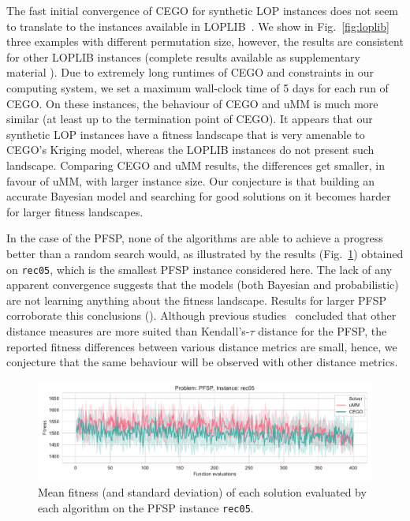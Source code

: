 \documentclass[runningheads]{llncs}
\begin{document}
The fast initial convergence of CEGO for synthetic LOP instances does not seem
to translate to the instances available in LOPLIB~\citep{}. We show in
Fig.~\ref{fig:loplib} three examples with different permutation size, however,
the results are consistent for other LOPLIB instances (complete results
available as supplementary material \supplement). Due to extremely long
runtimes of CEGO and constraints in our computing system, we set a maximum
wall-clock time of 5 days for each run of CEGO. On these instances, the
behaviour of CEGO and uMM is much more similar (at least up to the termination
point of CEGO). It appears that our synthetic LOP instances have a fitness
landscape that is very amenable to CEGO's Kriging model, whereas the LOPLIB
instances do not present such landscape. Comparing CEGO and uMM results, the
differences get smaller, in favour of uMM, with larger instance size. Our
conjecture is that building an accurate Bayesian model and searching for good
solutions on it becomes harder for larger fitness landscapes. 

In the case of the PFSP, none of the algorithms are able to achieve a
  progress better than a random search would, as illustrated by the results
  (Fig.~\ref{fig:rec05}) obtained on \texttt{rec05}, which is the smallest PFSP
  instance considered here. The lack of any apparent convergence suggests that
  the models (both Bayesian and probabilistic) are not learning anything about
  the fitness landscape. Results for larger PFSP corroborate this conclusions
  (\supplement). Although previous studies~\citep{ZaeStoBar2014:ppsn} concluded
  that other distance measures are more suited than Kendall's-$\tau$ distance
  for the PFSP, the reported fitness differences between various distance
  metrics are small, hence, we conjecture that the same behaviour will be
  observed with other distance metrics.
  

\begin{figure}
  \centering%
  \includegraphics[width=\textwidth]{img/fitness_real_pfsp_rec05_txt}
  \caption{Mean fitness  (and standard deviation)  of each solution evaluated by each algorithm on the PFSP instance \texttt{rec05}.\label{fig:rec05}}
\end{figure}
\end{document}
